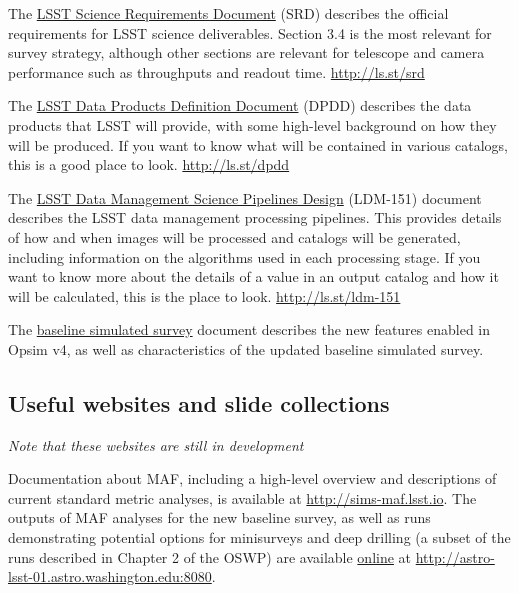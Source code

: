 \documentclass[DM,lsstdraft,toc,usenatbib]{lsstdoc}
\begin{document}
The \href{http:/ls.st/srd}{LSST Science Requirements Document} (SRD) describes the official requirements for LSST science deliverables. Section 3.4 is the most relevant for survey strategy, although other sections are relevant for telescope and camera performance such as throughputs and readout time. \url{http://ls.st/srd}

The \href{http://ls.st/dpdd}{LSST Data Products Definition Document} (DPDD) describes the data products that LSST will provide, with some high-level background on how they will be produced. If you want to know what will be contained in various catalogs, this is a good place to look. \url{http://ls.st/dpdd}

The \href{http://ls.st/ldm-151}{LSST Data Management Science Pipelines Design} (LDM-151) document describes the LSST data management processing pipelines. This provides details of how and when images will be processed and catalogs will be generated, including information on the algorithms used in each processing stage. If you want to know more about the details of a value in an output catalog and how it will be calculated, this is the place to look. \url{http://ls.st/ldm-151}


The \href{https://github.com/lsst-pst/survey_strategy/blob/master/db/baseline-doc/baseline.pdf}{baseline simulated survey} document describes the new features enabled in Opsim v4, as well as characteristics of the updated baseline simulated survey. 

\subsection{Useful websites and slide collections}

{\it Note that these websites are still in development}

Documentation about MAF, including a high-level overview and descriptions of current standard metric analyses, is available at \url{http://sims-maf.lsst.io}. 
The outputs of MAF analyses for the new baseline survey, as well as runs demonstrating potential options for minisurveys and deep drilling (a subset of the runs described in Chapter 2 of the OSWP) are available \href{http://astro-lsst-01.astro.washington.edu:8080}{online} at \url{http://astro-lsst-01.astro.washington.edu:8080}. 
\end{document}
